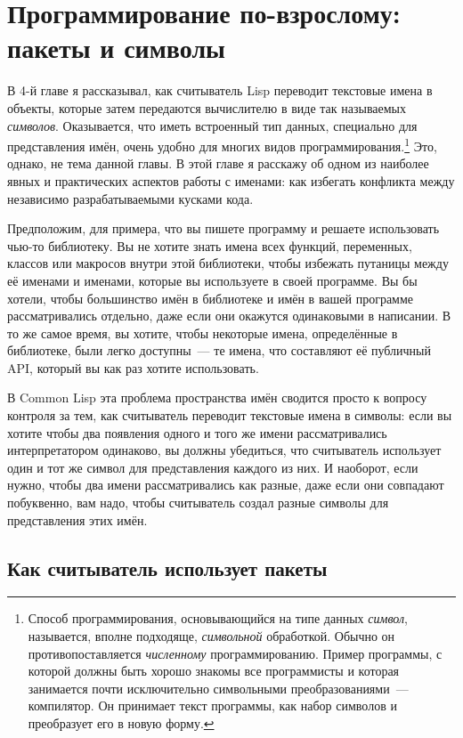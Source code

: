 \chapter{Программирование по-взрослому: пакеты и символы}
\label{ch:21}

В 4-й главе я рассказывал, как считыватель Lisp переводит текстовые имена в объекты,
которые затем передаются вычислителю в виде так называемых \textit{символов}.
Оказывается, что иметь встроенный тип данных, специально для представления имён, очень
удобно для многих видов программирования.\footnote{Способ программирования, основывающийся
  на типе данных \textit{символ}, называется, вполне подходяще, \textit{символьной}
  обработкой. Обычно он противопоставляется \textit{численному} программированию.  Пример
  программы, с которой должны быть хорошо знакомы все программисты и которая занимается
  почти исключительно символьными преобразованиями~--- компилятор. Он принимает текст
  программы, как набор символов и преобразует его в новую форму.} Это, однако, не тема
данной главы. В этой главе я расскажу об одном из наиболее явных и практических аспектов
работы с именами: как избегать конфликта между независимо разрабатываемыми кусками кода.

Предположим, для примера, что вы пишете программу и решаете использовать чью-то
библиотеку.  Вы не хотите знать имена всех функций, переменных, классов или макросов
внутри этой библиотеки, чтобы избежать путаницы между её именами и именами, которые вы
используете в своей программе. Вы бы хотели, чтобы большинство имён в библиотеке и имён в
вашей программе рассматривались отдельно, даже если они окажутся одинаковыми в написании.
В то же самое время, вы хотите, чтобы некоторые имена, определённые в библиотеке, были
легко доступны~--- те имена, что составляют её публичный API, который вы как раз хотите
использовать.

В Common Lisp эта проблема пространства имён сводится просто к вопросу контроля за тем,
как считыватель переводит текстовые имена в символы: если вы хотите чтобы два появления
одного и того же имени рассматривались интерпретатором одинаково, вы должны убедиться, что
считыватель использует один и тот же символ для представления каждого из них. И наоборот,
если нужно, чтобы два имени рассматривались как разные, даже если они совпадают
побуквенно, вам надо, чтобы считыватель создал разные символы для представления этих имён.

\section{Как считыватель использует пакеты}

